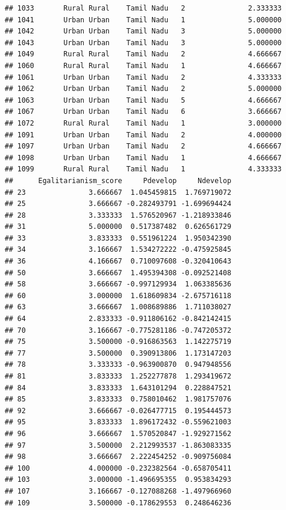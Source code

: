 \documentclass[
]{article}
\begin{document}
\begin{verbatim}
## 1033       Rural Rural    Tamil Nadu   2               2.333333
## 1041       Urban Urban    Tamil Nadu   1               5.000000
## 1042       Urban Urban    Tamil Nadu   3               5.000000
## 1043       Urban Urban    Tamil Nadu   3               5.000000
## 1049       Rural Rural    Tamil Nadu   2               4.666667
## 1060       Rural Rural    Tamil Nadu   1               4.666667
## 1061       Urban Urban    Tamil Nadu   2               4.333333
## 1062       Urban Urban    Tamil Nadu   2               5.000000
## 1063       Urban Urban    Tamil Nadu   5               4.666667
## 1067       Urban Urban    Tamil Nadu   6               3.666667
## 1072       Rural Rural    Tamil Nadu   1               3.000000
## 1091       Urban Urban    Tamil Nadu   2               4.000000
## 1097       Urban Urban    Tamil Nadu   2               4.666667
## 1098       Urban Urban    Tamil Nadu   1               4.666667
## 1099       Rural Rural    Tamil Nadu   1               4.333333
##      Egalitarianism_score     Pdevelop     Ndevelop
## 23               3.666667  1.045459815  1.769719072
## 25               3.666667 -0.282493791 -1.699694424
## 28               3.333333  1.576520967 -1.218933846
## 31               5.000000  0.517387482  0.626561729
## 33               3.833333  0.551961224  1.950342390
## 34               3.166667  1.534272222 -0.475925845
## 36               4.166667  0.710097608 -0.320410643
## 50               3.666667  1.495394308 -0.092521408
## 58               3.666667 -0.997129934  1.063385636
## 60               3.000000  1.618609834 -2.675716118
## 63               3.666667  1.008689886  1.711038027
## 64               2.833333 -0.911806162 -0.842142415
## 70               3.166667 -0.775281186 -0.747205372
## 75               3.500000 -0.916863563  1.142275719
## 77               3.500000  0.390913806  1.173147203
## 78               3.333333 -0.963900870  0.947948556
## 81               3.833333  1.252277878  1.293419672
## 84               3.833333  1.643101294  0.228847521
## 85               3.833333  0.758010462  1.981757076
## 92               3.666667 -0.026477715  0.195444573
## 95               3.833333  1.896172432 -0.559621003
## 96               3.666667  1.570520847 -1.929271562
## 97               3.500000  2.212993537 -1.863083335
## 98               3.666667  2.222454252 -0.909756084
## 100              4.000000 -0.232382564 -0.658705411
## 103              3.000000 -1.496695355  0.953834293
## 107              3.166667 -0.127088268 -1.497966960
## 109              3.500000 -0.178629553  0.248646236

\end{verbatim}
\end{document}
